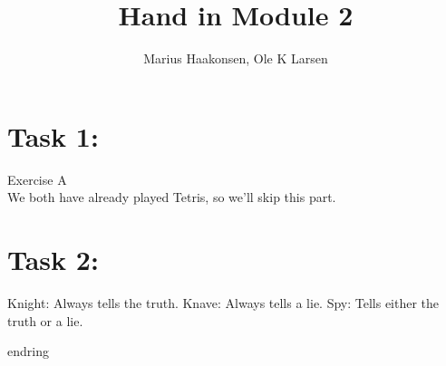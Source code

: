 \documentclass[11pt]{amsart}
\title{Hand in Module 2}
\author{Marius Haakonsen, Ole K Larsen}
\begin{document}
\maketitle

\section{Task 1:}

Exercise A  \\
We both have already played Tetris, so we'll skip this part.  \\





\section{Task 2:}

Knight: Always tells the truth.
Knave: Always tells a lie.
Spy: Tells either the truth or a lie.

endring
\end{document}
